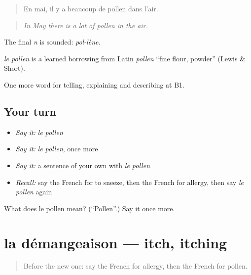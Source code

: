 \begin{quote}
En mai, il y a beaucoup de pollen dans l'air.
\end{quote}

\begin{quote}
\emph{In May there is a lot of pollen in the air.}
\end{quote}

The final \emph{n} is sounded: \emph{pol-lène}.

\begin{cousinweb}
\emph{le pollen} is a learned borrowing from Latin \emph{pollen} \textquotedblleft{}fine flour, powder\textquotedblright{} (Lewis \& Short).
\end{cousinweb}

\begin{grammarlens}[title={What you've built}]
One more word for telling, explaining and describing at B1.
\end{grammarlens}

\subsection*{Your turn}
\begin{itemize}
\raggedright
  \item \emph{Say it:} \emph{le pollen}
  \item \emph{Say it:} \emph{le pollen}, once more
  \item \emph{Say it:} a sentence of your own with \emph{le pollen}
  \item \emph{Recall:} say the French for to sneeze, then the French for allergy, then say \emph{le pollen} again
\end{itemize}

\begin{tcolorbox}[breakable,colback=teal!4,colframe=teal!35!black,title={Before you move on}]
What does le pollen mean? (\textquotedblleft{}Pollen\textquotedblright{}.) Say it once more.
\end{tcolorbox}
\section[la démangeaison]{la démangeaison — itch, itching}

\label{lesson:FR-C482-demangeaison}



\begin{quote}
Before the new one: say the French for allergy, then the French for pollen.
\end{quote}

